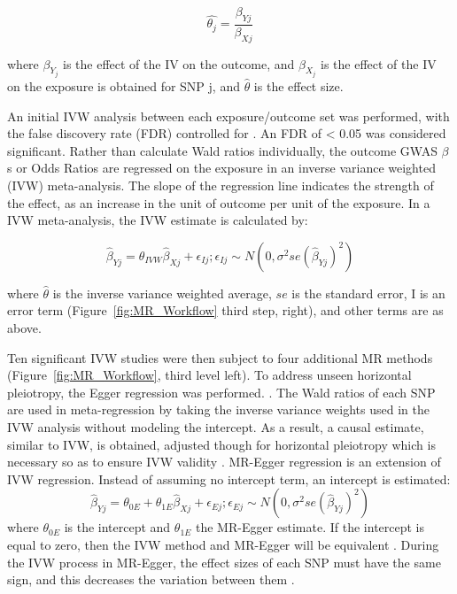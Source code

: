 \documentclass[journal,article,submit,moreauthors,pdftex]{Definitions/mdpi}
\begin{document}
\begin{equation}
\widehat{\theta_j}    = \frac{\beta_{Yj}}{\beta_{Xj}}
\end{equation}

where $\beta_Y_j$ is the effect of the IV on the outcome, and $\beta_X_j$ is the effect of the IV on the exposure is obtained for SNP j, and $\widehat{\theta}$ is the effect size.

An initial IVW analysis between each exposure/outcome set was performed, with the false discovery rate (FDR) controlled for \cite{benyamin_family-based_2009}. An FDR of < 0.05 was considered significant. Rather than calculate Wald ratios individually, the outcome GWAS $\beta$s or Odds Ratios are regressed on the exposure in an inverse variance weighted (IVW) meta-analysis. The slope of the regression line indicates the strength of the effect, as an increase in the unit of outcome per unit of the exposure\cite{burgess_interpreting_2017}. 
In a IVW meta-analysis, the  IVW estimate is calculated by:

\begin{equation}
\widehat{\beta}_{Yj} = \theta_{IVW}\widehat{\beta}_{Xj} + \epsilon_{Ij};      \epsilon_{Ij} \sim N(0,\sigma^2se(\widehat{\beta}_{Yj})^2)
\end{equation}

where $\widehat{\theta}$ is the inverse variance weighted average, $se$ is the standard error, I is an error term (Figure~\ref{fig:MR_Workflow} third step, right), and other terms are as above.

Ten significant IVW studies were then subject to four additional MR methods (Figure~\ref{fig:MR_Workflow}, third level left).  To address unseen horizontal pleiotropy, the Egger regression was performed. \cite{bowden_framework_2017,bowden_mendelian_2015}. The Wald ratios of each SNP are used in meta-regression by taking the inverse variance weights used in the IVW analysis without modeling the intercept. As a result, a causal estimate, similar to IVW, is obtained, adjusted though for horizontal pleiotropy which is necessary so as to ensure IVW validity \cite{bowden_mendelian_2015}.
MR-Egger regression is an extension of IVW regression. Instead of assuming no intercept term, an intercept is estimated:
\begin{equation}
\widehat{\beta}_{Yj} = \theta_{0E} + \theta_{1E}\widehat{\beta}_{Xj} + \epsilon_{Ej}; \epsilon_{Ej} \sim N(0,\sigma^2se(\widehat{\beta}_{Yj})^2)
\end{equation}
where $\theta_{0E}$ is the intercept and $\theta_{1E}$ the MR-Egger estimate.
If the intercept is equal to zero, then the IVW method and MR-Egger will be equivalent \cite{burgess_interpreting_2017}. During the IVW process in MR-Egger, the effect sizes of each SNP must have the same sign, and this decreases the variation between them \cite{bowden_mendelian_2015}.
\end{document}
